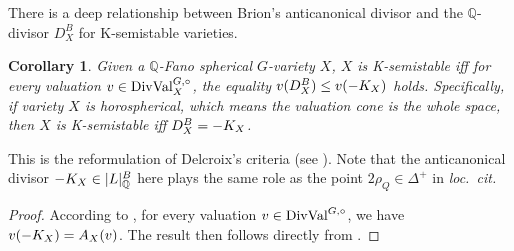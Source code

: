 \documentclass[11pt, oneside]{amsart}
\newtheorem{corollary}[theorem]{Corollary}
\newcommand{\<}{\left\langle} \renewcommand{\>}{\right\rangle}
\begin{document}
There is a deep relationship between Brion's anticanonical divisor and the $\mathbb{Q}$-divisor $D^B_X$ for K-semistable varieties.
\begin{corollary}
    Given a $\mathbb{Q}$-Fano spherical $G$-variety $X$, $X$ is K-semistable iff for every valuation $v \in \mathrm{DivVal}^{G, \circ}_X$, the equality $v(D^B_X) \leq v(-K_X)$ holds. Specifically, if variety $X$ is horospherical, which means the valuation cone is the whole space, then $X$ is K-semistable iff $D^B_X = -K_X$.
\end{corollary}
\begin{remark*}
    This is the reformulation of Delcroix's criteria (see \cite[Theorem 5.3 and Corollary 5.7]{Delcroix_Kst_Fano_spher}). Note that the anticanonical divisor $-K_X \in \mathopen{}\left|L\right|\mathclose{}_\mathbb{Q}^B$ here plays the same role as the point $2 \rho_Q \in \Delta^+$ in \textit{loc.~cit.}
\end{remark*}
\begin{proof}
    According to \cite[Proof of Proposition 5.2]{Pas_sing_sphe}, for every valuation $v \in \mathrm{DivVal}^{G, \circ}$, we have $v(-K_X) = A_X(v)$. The result then follows directly from .
\end{proof}
\end{document}
